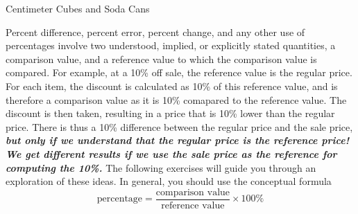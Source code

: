 \begin{act}Centimeter Cubes and Soda Cans\end{act}
Percent difference, percent error, percent change, and any other use of percentages involve two understood, implied, or explicitly stated quantities, a comparison value, and a reference value to which the comparison value is compared. For example, at a 10\% off sale, the reference value is the regular price. For each item, the discount is calculated as 10\% of this reference value, and is therefore a comparison value as it is 10\% comapared to the reference value. The discount is then taken, resulting in a price that is 10\% lower than the regular price. There is thus a 10\% difference between the regular price and the sale price, \textit{\textbf{but only if we understand that the regular price is the reference price! We get different results if we use the sale price as the reference for computing the 10\%.}} The following exercises will guide you through an exploration of these ideas. In general, you should use the conceptual formula \[\text{percentage}=\frac{\text{comparison value}}{\text{reference value}}\times 100\%\]
